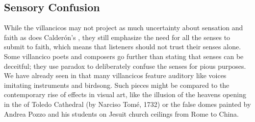 
\subsection{Sensory Confusion}

While the  villancicos may not project as much
uncertainty about sensation and faith as does Calderón's , they still emphasize the need for all the senses to submit
to faith, which means that listeners should not trust their senses alone.
Some villancico poets and composers go further than stating that senses can be
deceitful; they use paradox to deliberately confuse the senses for pious
purposes.
We have already seen in  that many villancicos feature
auditory  like voices imitating instruments and
birdsong.
Such pieces might be compared to the contemporary rise of 
effects in visual art, like the illusion of the heavens opening in the
 of Toledo Cathedral (by Narciso Tomé, 1732) or the false
domes painted by Andrea Pozzo and his students on Jesuit church ceilings from
Rome to China.%
    \Autocites
    []{GroveArt}
    [110]{Bailey:Art}


